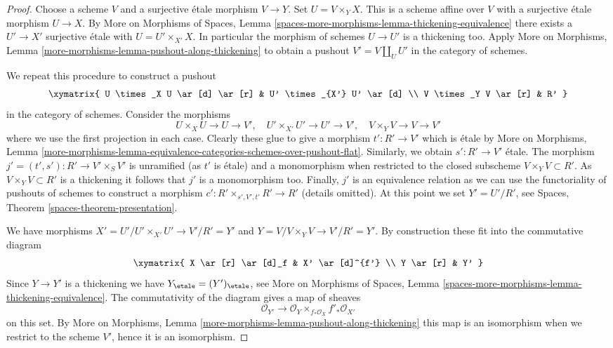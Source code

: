 \begin{proof}
Choose a scheme $V$ and a surjective \'etale morphism $V \to Y$.
Set $U = V \times_Y X$. This is a scheme affine over $V$ with a
surjective \'etale morphism $U \to X$. By More on Morphisms of Spaces,
Lemma \ref{spaces-more-morphisms-lemma-thickening-equivalence}
there exists a $U' \to X'$
surjective \'etale with $U = U' \times_{X'} X$. In particular the
morphism of schemes $U \to U'$ is a thickening too. Apply
More on Morphisms, Lemma \ref{more-morphisms-lemma-pushout-along-thickening}
to obtain a pushout $V' = V \amalg_U U'$ in the category of schemes.

\medskip\noindent
We repeat this procedure to construct a pushout
$$
\xymatrix{
U \times_X U \ar[d] \ar[r] & U' \times_{X'} U' \ar[d] \\
V \times_Y V \ar[r] & R'
}
$$
in the category of schemes. Consider the morphisms
$$
U \times_X U \to U \to V',\quad
U' \times_{X'} U' \to U' \to V',\quad
V \times_Y V \to V \to V'
$$
where we use the first projection in each case. Clearly these glue to
give a morphism $t' : R' \to V'$ which is \'etale by
More on Morphisms, Lemma
\ref{more-morphisms-lemma-equivalence-categories-schemes-over-pushout-flat}.
Similarly, we obtain $s' : R' \to V'$ \'etale.
The morphism $j' = (t', s') : R' \to V' \times_S V'$ is unramified
(as $t'$ is \'etale) and a monomorphism when restricted to the closed
subscheme $V \times_Y V \subset R'$. As $V \times_Y V \subset R'$ is
a thickening it follows that $j'$ is a monomorphism too. Finally, $j'$
is an equivalence relation as we can use the functoriality of pushouts
of schemes to construct a morphism $c' : R' \times_{s', V', t'} R' \to R'$
(details omitted). At this point we set $Y' = U'/R'$, see
Spaces, Theorem \ref{spaces-theorem-presentation}.

\medskip\noindent
We have morphisms $X' = U'/U' \times_{X'} U' \to V'/R' = Y'$ and
$Y = V/V \times_Y V \to V'/R' = Y'$.
By construction these fit into the commutative diagram
$$
\xymatrix{
X \ar[r] \ar[d]_f & X' \ar[d]^{f'} \\
Y \ar[r] & Y'
}
$$
Since $Y \to Y'$ is a thickening we have
$Y_\etale = (Y')_\etale$, see More on Morphisms of Spaces,
Lemma \ref{spaces-more-morphisms-lemma-thickening-equivalence}.
The commutativity of the diagram gives a map of sheaves
$$
\mathcal{O}_{Y'}
\longrightarrow
\mathcal{O}_Y \times_{f_*\mathcal{O}_X} f'_*\mathcal{O}_{X'}
$$
on this set. By More on Morphisms, Lemma
\ref{more-morphisms-lemma-pushout-along-thickening}
this map is an isomorphism when we restrict to
the scheme $V'$, hence it is an isomorphism.


\end{proof}
